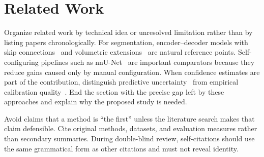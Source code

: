 \section{Related Work}
\label{sec:related-work}

Organize related work by technical idea or unresolved limitation rather than
by listing papers chronologically.  For segmentation, encoder--decoder models
with skip connections~\cite{ronneberger2015unet} and volumetric
extensions~\cite{cicek20163d,milletari2016vnet} are natural reference points.
Self-configuring pipelines such as nnU-Net~\cite{isensee2021nnu} are important
comparators because they reduce gains caused only by manual configuration.
When confidence estimates are part of the contribution, distinguish predictive
uncertainty~\cite{kendall2017uncertainties} from empirical calibration
quality~\cite{guo2017calibration}.  End the section with the precise gap left by
these approaches and explain why the proposed study is needed.

Avoid claims that a method is ``the first'' unless the literature search makes
that claim defensible.  Cite original methods, datasets, and evaluation
measures rather than secondary summaries.  During double-blind review,
self-citations should use the same grammatical form as other citations and
must not reveal identity.
